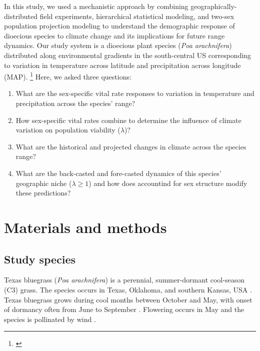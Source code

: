 \documentclass[11pt]{article}
\newcommand{\tom}[2]{{\color{red}{#1}}\footnote{\textit{\color{red}{#2}}}}
\begin{document}
In this study, we used a mechanistic approach by combining geographically-distributed field experiments, hierarchical statistical modeling, and two-sex population projection modeling to understand the demographic response of dioecious species to climate change and its implications for future range dynamics.
Our study system is a dioecious plant species (\textit{Poa arachnifera}) distributed along environmental gradients in the south-central US corresponding to variation in temperature across latitude and precipitation across longitude (MAP). \tom{}{I would include a few more sentences of context about the study before jumping to the questions. For example it seems relevant to acknowledge the previous study and highlight that our previous approach used proxy variables, so could not be used to forecast responses to environmental change.}
Here, we asked three questions: 
\begin{enumerate}
	\item What are the sex-specific vital rate responses to variation in temperature and precipitation across the species' range?
	\item How sex-specific vital rates combine to determine the influence of climate variation on population viability ($\lambda$)?
	\item What are the historical and projected changes in climate across the species range?
	\item What are the back-casted and fore-casted dynamics of this species' geographic niche ($\lambda \geq 1$) and how does accountind for sex structure modify these predictions?
\end{enumerate}


\section*{Materials and methods}

\subsection*{Study species}
Texas bluegrass (\textit{Poa arachnifera}) is a perennial, summer-dormant cool-season (C3) grass. 
The species occurs in Texas, Oklahoma, and southern Kansas, USA \citep{hitchcock1971manual}. 
Texas bluegrass grows during cool months between October and May, with onset of dormancy often from June to September \citep{kindiger2004interspecific}.
Flowering occurs in May and the species is pollinated by wind \citep{hitchcock1971manual}.
\end{document}
